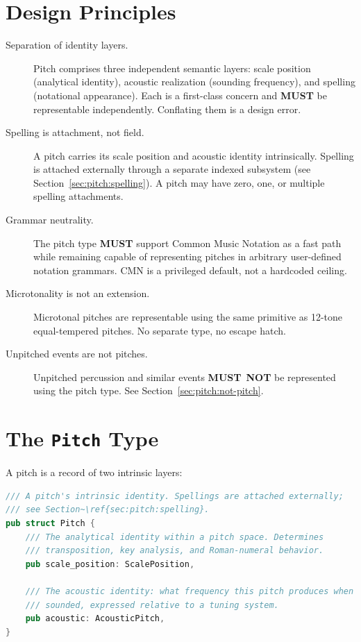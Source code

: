 \documentclass[11pt,letterpaper]{report}
\newcommand{\MUST}{\textbf{MUST}}
\newcommand{\MUSTNOT}{\textbf{MUST}\nobreak\ \textbf{NOT}}
\begin{document}
\section{Design Principles}
\label{sec:pitch:principles}

\begin{description}
  \item[Separation of identity layers.] Pitch comprises three
    independent semantic layers: scale position (analytical identity),
    acoustic realization (sounding frequency), and spelling (notational
    appearance). Each is a first-class concern and \MUST{} be
    representable independently. Conflating them is a design error.
  \item[Spelling is attachment, not field.] A pitch carries its scale
    position and acoustic identity intrinsically. Spelling is attached
    externally through a separate indexed subsystem (see
    Section~\ref{sec:pitch:spelling}). A pitch may have zero, one, or
    multiple spelling attachments.
  \item[Grammar neutrality.] The pitch type \MUST{} support Common Music
    Notation as a fast path while remaining capable of representing
    pitches in arbitrary user-defined notation grammars. CMN is a
    privileged default, not a hardcoded ceiling.
  \item[Microtonality is not an extension.] Microtonal pitches are
    representable using the same primitive as 12-tone equal-tempered
    pitches. No separate type, no escape hatch.
  \item[Unpitched events are not pitches.] Unpitched percussion and
    similar events \MUSTNOT{} be represented using the pitch type.
    See Section~\ref{sec:pitch:not-pitch}.
\end{description}

\section{The \texttt{Pitch} Type}
\label{sec:pitch:type}

A pitch is a record of two intrinsic layers:

\begin{lstlisting}[language=Rust]
/// A pitch's intrinsic identity. Spellings are attached externally;
/// see Section~\ref{sec:pitch:spelling}.
pub struct Pitch {
    /// The analytical identity within a pitch space. Determines
    /// transposition, key analysis, and Roman-numeral behavior.
    pub scale_position: ScalePosition,

    /// The acoustic identity: what frequency this pitch produces when
    /// sounded, expressed relative to a tuning system.
    pub acoustic: AcousticPitch,
}
\end{lstlisting}
\end{document}
